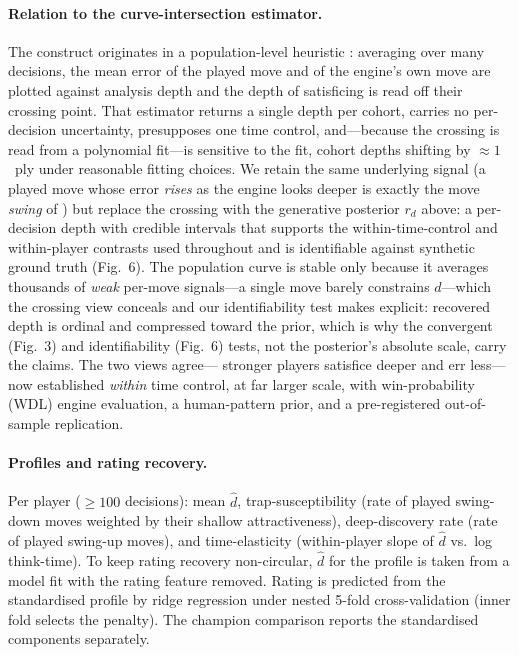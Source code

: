 \documentclass[11pt]{article}
\begin{document}
\paragraph{Relation to the curve-intersection estimator.} The construct originates in a
population-level heuristic \citep{biswas2015}: averaging over many decisions, the mean error of
the played move and of the engine's own move are plotted against analysis depth and the depth
of satisficing is read off their crossing point. That estimator returns a single depth per
cohort, carries no per-decision uncertainty, presupposes one time control, and---because the
crossing is read from a polynomial fit---is sensitive to the fit, cohort depths shifting by
$\approx\!1$~ply under reasonable fitting choices. We retain the same underlying signal (a
played move whose error \emph{rises} as the engine looks deeper is exactly the move
\emph{swing} of \citealp{biswas2015}) but replace the crossing with the generative posterior
$r_d$ above: a per-decision depth with credible intervals that supports the
within-time-control and within-player contrasts used throughout and is identifiable against
synthetic ground truth (Fig.~6). The population curve is stable only because it averages
thousands of \emph{weak} per-move signals---a single move barely constrains $d$---which the
crossing view conceals and our identifiability test makes explicit: recovered depth is ordinal
and compressed toward the prior, which is why the convergent (Fig.~3) and identifiability
(Fig.~6) tests, not the posterior's absolute scale, carry the claims. The two views agree---
stronger players satisfice deeper and err less---now established \emph{within} time control, at
far larger scale, with win-probability (WDL) engine evaluation, a human-pattern prior, and a
pre-registered out-of-sample replication.

\paragraph{Profiles and rating recovery.} Per player ($\ge100$ decisions): mean $\hat d$,
trap-susceptibility (rate of played swing-down moves weighted by their shallow attractiveness),
deep-discovery rate (rate of played swing-up moves), and time-elasticity (within-player slope
of $\hat d$ vs.\ log think-time). To keep rating recovery non-circular, $\hat d$ for the
profile is taken from a model fit with the rating feature removed. Rating is predicted from the
standardised profile by ridge regression under nested 5-fold cross-validation (inner fold
selects the penalty). The champion comparison reports the standardised components separately.
\end{document}

